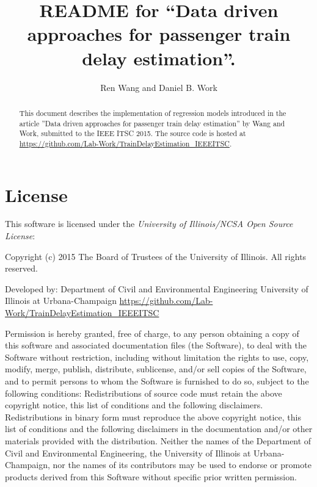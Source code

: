 \documentclass[english]{article}
\begin{document}
\title{README for ``Data driven approaches for passenger train delay estimation''. }


\author{Ren Wang and Daniel B. Work}
\maketitle
\begin{abstract}
This document describes the implementation of regression models introduced in the article
''Data driven approaches for passenger train delay estimation'' by Wang and Work,
submitted to the IEEE ITSC 2015. The source code is hosted at \url{https://github.com/Lab-Work/TrainDelayEstimation_IEEEITSC}.
\end{abstract}

\section{License}

This software is licensed under the \emph{University of Illinois/NCSA
Open Source License}:

\begin{center}
Copyright (c) 2015 The Board of Trustees of the University of Illinois.
All rights reserved.
\par\end{center}

\begin{center}
Developed by: Department of Civil and Environmental Engineering University
of Illinois at Urbana-Champaign \url{https://github.com/Lab-Work/TrainDelayEstimation_IEEEITSC}
\par\end{center}

Permission is hereby granted, free of charge, to any person obtaining
a copy of this software and associated documentation files (the \textquotedbl{}Software\textquotedbl{}),
to deal with the Software without restriction, including without limitation
the rights to use, copy, modify, merge, publish, distribute, sublicense,
and/or sell copies of the Software, and to permit persons to whom
the Software is furnished to do so, subject to the following conditions:
Redistributions of source code must retain the above copyright notice,
this list of conditions and the following disclaimers. Redistributions
in binary form must reproduce the above copyright notice, this list
of conditions and the following disclaimers in the documentation and/or
other materials provided with the distribution. Neither the names
of the Department of Civil and Environmental Engineering, the University
of Illinois at Urbana-Champaign, nor the names of its contributors
may be used to endorse or promote products derived from this Software
without specific prior written permission.
\end{document}
